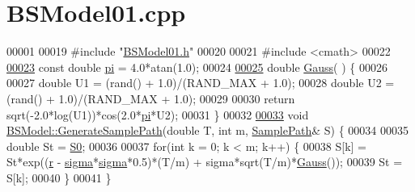 \hypertarget{BSModel01_8cpp_source}{\section{B\+S\+Model01.\+cpp}
}

\begin{DoxyCode}
00001 
00019 \textcolor{preprocessor}{#include "\hyperlink{BSModel01_8h}{BSModel01.h}"}
00020 
00021 \textcolor{preprocessor}{#include <cmath>}
00022 
\hypertarget{BSModel01_8cpp_source_l00023}{}\hyperlink{BSModel01_8cpp_a43016d873124d39034edb8cd164794db}{00023} \textcolor{keyword}{const} \textcolor{keywordtype}{double} \hyperlink{BSModel01_8cpp_a43016d873124d39034edb8cd164794db}{pi} = 4.0*atan(1.0);
00024 
\hypertarget{BSModel01_8cpp_source_l00025}{}\hyperlink{BSModel01_8cpp_aa5430ef684e160310d140e8914e32218}{00025} \textcolor{keywordtype}{double} \hyperlink{BSModel01_8cpp_aa5430ef684e160310d140e8914e32218}{Gauss}( ) \{
00026 
00027   \textcolor{keywordtype}{double} U1 = (rand() + 1.0)/(RAND\_MAX + 1.0);
00028   \textcolor{keywordtype}{double} U2 = (rand() + 1.0)/(RAND\_MAX + 1.0);
00029 
00030   \textcolor{keywordflow}{return} sqrt(-2.0*log(U1))*cos(2.0*\hyperlink{BSModel01_8cpp_a43016d873124d39034edb8cd164794db}{pi}*U2);
00031 \}
00032 
\hypertarget{BSModel01_8cpp_source_l00033}{}\hyperlink{classBSModel_aad0f0d6d1b9df4d76d03bd0b477e1347}{00033} \textcolor{keywordtype}{void} \hyperlink{classBSModel_aad0f0d6d1b9df4d76d03bd0b477e1347}{BSModel::GenerateSamplePath}(\textcolor{keywordtype}{double} T, \textcolor{keywordtype}{int} m, 
      \hyperlink{BSModel01_8h_afbb1a5715857075c187084894fc00d31}{SamplePath}& S) \{
00034 
00035   \textcolor{keywordtype}{double} St = \hyperlink{classBSModel_a2b37a14d9aaab033d676dd16381f7f19}{S0};
00036 
00037   \textcolor{keywordflow}{for}(\textcolor{keywordtype}{int} k = 0; k < m; k++) \{
00038     S[k] = St*exp((\hyperlink{classBSModel_add3230c0df8e47623116b439598c0de3}{r} - \hyperlink{classBSModel_a1267641043c16cd9baf2eb242320f0d3}{sigma}*\hyperlink{classBSModel_a1267641043c16cd9baf2eb242320f0d3}{sigma}*0.5)*(T/m) + sigma*sqrt(T/m)*\hyperlink{BSModel01_8cpp_aa5430ef684e160310d140e8914e32218}{Gauss}());
00039     St = S[k];
00040   \}
00041 \}
\end{DoxyCode}
